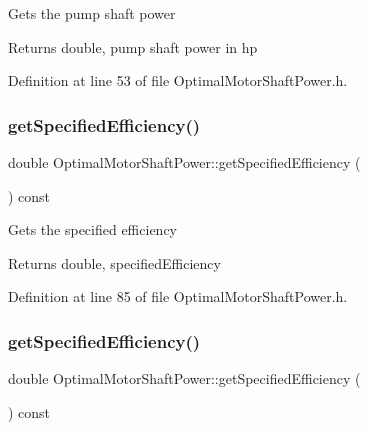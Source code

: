 Gets the pump shaft power \begin{DoxyReturn}{Returns}
double, pump shaft power in hp 
\end{DoxyReturn}


Definition at line 53 of file Optimal\+Motor\+Shaft\+Power.\+h.

\mbox{\label{class_optimal_motor_shaft_power_a89c2038dae30ef58245e810187c2a6c4}} 
\subsubsection{\texorpdfstring{get\+Specified\+Efficiency()}{getSpecifiedEfficiency()}\hspace{0.1cm}{\footnotesize\ttfamily [1/3]}}
{\footnotesize\ttfamily double Optimal\+Motor\+Shaft\+Power\+::get\+Specified\+Efficiency (\begin{DoxyParamCaption}{ }\end{DoxyParamCaption}) const\hspace{0.3cm}{\ttfamily [inline]}}

Gets the specified efficiency \begin{DoxyReturn}{Returns}
double, specified\+Efficiency 
\end{DoxyReturn}


Definition at line 85 of file Optimal\+Motor\+Shaft\+Power.\+h.

\mbox{\label{class_optimal_motor_shaft_power_a89c2038dae30ef58245e810187c2a6c4}} 
\subsubsection{\texorpdfstring{get\+Specified\+Efficiency()}{getSpecifiedEfficiency()}\hspace{0.1cm}{\footnotesize\ttfamily [2/3]}}
{\footnotesize\ttfamily double Optimal\+Motor\+Shaft\+Power\+::get\+Specified\+Efficiency (\begin{DoxyParamCaption}{ }\end{DoxyParamCaption}) const\hspace{0.3cm}{\ttfamily [inline]}}

